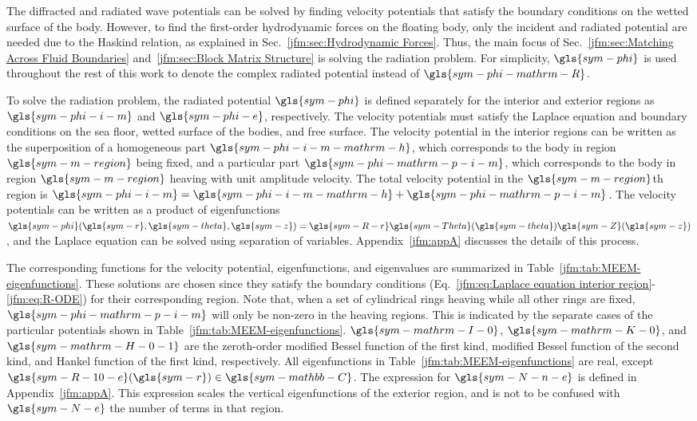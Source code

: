 \documentclass[lineno]{JFM-FLM_Au}
\begin{document}
The diffracted and radiated wave potentials can be solved by finding velocity potentials that satisfy the boundary conditions on the wetted surface of the body. 
However, to find the first-order hydrodynamic forces on the floating body, only the incident and radiated potential are needed due to the Haskind relation, as explained in Sec.~\ref{jfm:sec:Hydrodynamic Forces}. 
Thus, the main focus of Sec.~\ref{jfm:sec:Matching Across Fluid Boundaries} and~\ref{jfm:sec:Block Matrix Structure} is solving the radiation problem. 
For simplicity, $\gls{sym-phi}$ is used throughout the rest of this work 
to denote the complex radiated potential instead of $\gls{sym-phi-mathrm-R}$. 

To solve the radiation problem, the radiated potential $\gls{sym-phi}$ is defined separately 
for the interior and exterior regions as $\gls{sym-phi-i-m}$ and $\gls{sym-phi-e}$, respectively. 
The velocity potentials must satisfy the Laplace equation and boundary conditions 
on the sea floor, wetted surface of the bodies, and free surface. 
The velocity potential in the interior regions can be written as the superposition 
of a homogeneous part $\gls{sym-phi-i-m-mathrm-h}$, which corresponds to the body in region $\gls{sym-m-region}$ being fixed, 
and a particular part $\gls{sym-phi-mathrm-p-i-m}$, which corresponds to the body in region $\gls{sym-m-region}$ heaving with unit amplitude velocity. 
The total velocity potential in the $\gls{sym-m-region}$th region is 
$\gls{sym-phi-i-m}= \gls{sym-phi-i-m-mathrm-h} + \gls{sym-phi-mathrm-p-i-m}$. 
The velocity potentials can be written as a product of eigenfunctions 
$\gls{sym-phi} (\gls{sym-r}, \gls{sym-theta}, \gls{sym-z})= \gls{sym-R-r}\gls{sym-Theta}(\gls{sym-theta})\gls{sym-Z}(\gls{sym-z})$, 
and the Laplace equation can be solved using separation of variables. 
Appendix~\ref{jfm:appA} discusses the details of this process.

The corresponding functions for the velocity potential, eigenfunctions, and eigenvalues 
are summarized in Table~\ref{jfm:tab:MEEM-eigenfunctions}. 
These solutions are chosen since they satisfy the boundary conditions (Eq.~\ref{jfm:eq:Laplace equation interior region}-\ref{jfm:eq:R-ODE}) for their corresponding region. 
Note that, when \modelling{} a set of cylindrical rings heaving while all other rings are fixed, 
$\gls{sym-phi-mathrm-p-i-m}$ will only be non-zero in the heaving regions. 
This is indicated by the separate cases of the particular potentials shown in Table~\ref{jfm:tab:MEEM-eigenfunctions}. 
$\gls{sym-mathrm-I-0}$, $\gls{sym-mathrm-K-0}$, and $\gls{sym-mathrm-H-0-1}$
are the zeroth-order modified Bessel function of the first kind, modified Bessel function of the second kind, and Hankel function of the first kind, respectively. 
All eigenfunctions in Table~\ref{jfm:tab:MEEM-eigenfunctions} are real, except $\gls{sym-R-10-e}(\gls{sym-r})\in\gls{sym-mathbb-C}$.
The expression for $\gls{sym-N-n-e}$ is defined in Appendix~\ref{jfm:appA}.
This expression scales the vertical eigenfunctions of the exterior region, and is not to be confused with $\gls{sym-N-e}$ the number of terms in that region. 
\end{document}
